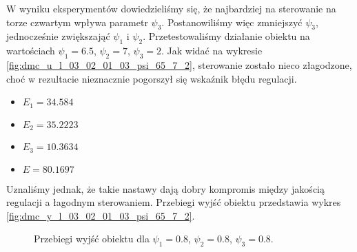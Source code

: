 W wyniku eksperymentów dowiedzieliśmy się, że najbardziej na sterowanie na torze czwartym wpływa parametr $\psi_3$. Postanowiliśmy więc zmniejszyć $\psi_3$, jednocześnie zwiększająć $\psi_1$ i $\psi_2$. Przetestowaliśmy działanie obiektu na wartościach $\psi_1=\num{6,5}$, $\psi_2=7$, $\psi_3=2$. Jak widać na wykresie \ref{fig:dmc_u_l_03_02_01_03_psi_65_7_2}, sterowanie zostało nieco złagodzone, choć w rezultacie nieznacznie pogorszył się wskaźnik błędu regulacji.
\begin{itemize}
\item $E_1=\num{34,584}$
\item $E_2=\num{35,2223}$
\item $E_3=\num{10,3634}$
\item $E=\num{80,1697}$
\end{itemize}
Uznaliśmy jednak, że takie nastawy dają dobry kompromis między jakością regulacji a łagodnym sterowaniem. Przebiegi wyjść obiektu przedstawia wykres \ref{fig:dmc_y_l_03_02_01_03_psi_65_7_2}.

\begin{figure}
	\centering
	\caption{Przebiegi wyjść obiektu dla $\psi_1=\num{0,8}$, $\psi_2=\num{0,8}$, $\psi_3=\num{0,8}$.}
	\label{fig:dmc_y_l_03_02_01_03_psi_08_08_08}
\end{figure}

